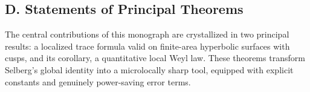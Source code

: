 
\subsection*{D. Statements of Principal Theorems}
\label{sub:intro-mainthms}

The central contributions of this monograph are crystallized in two principal results:
a localized trace formula valid on finite-area hyperbolic surfaces with cusps,
and its corollary, a quantitative local Weyl law.
These theorems transform Selberg’s global identity into a microlocally sharp tool,
equipped with explicit constants and genuinely power-saving error terms.

\medskip

